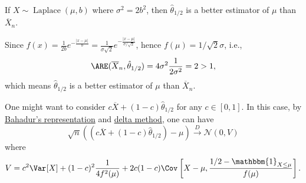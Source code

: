 \begin{eg}\label{eg:ARE-Laplace}
	If \(X \sim \operatorname{Laplace}(\mu , b) \) where \(\sigma ^2 = 2b^2\), then \(\hat{\theta} _{1 / 2}\) is a better estimator of \(\mu \) than \(\overline{X} _n\).
\end{eg}
\begin{explanation}
	Since \(f(x) = \frac{1}{2b} e^{- \frac{\vert x - \mu \vert }{b}} = \frac{1}{\sigma \sqrt{2} } e^{- \frac{\vert x - \mu \vert }{\sigma / \sqrt{2}}}\), hence \(f(\mu ) = 1 /\sqrt{2} \sigma \), i.e.,
	\[
		\ARE(\overline{X} _n, \hat{\theta} _{1 / 2})
		= 4 \sigma ^2 \frac{1}{2 \sigma ^2}
		= 2 > 1,
	\]
	which means \(\hat{\theta} _{1 / 2}\) is a better estimator of \(\mu \) than \(\overline{X} _n\).
\end{explanation}

One might want to consider \(c \overline{X} + (1 - c)\hat{\theta} _{1 / 2}\) for any \(c \in [0, 1]\). In this case, by \hyperref[thm:Bahadur-representation]{Bahadur's representation} and \hyperref[thm:delta-method]{delta method}, one can have
\[
	\sqrt{n} \left( (c \overline{X} + (1 - c)\hat{\theta} _{1 / 2}) - \mu \right) \overset{D}{\to} \mathcal{N} (0, V)
\]
where
\[
	V = c^2 \Var_{}[X] + (1 - c)^2 \frac{1}{4 f^2(\mu )} + 2c(1 - c) \Cov_{}\left[X - \mu , \frac{1 / 2 - \mathbbm{1}_{X \leq \mu } }{f(\mu )}\right].
\]